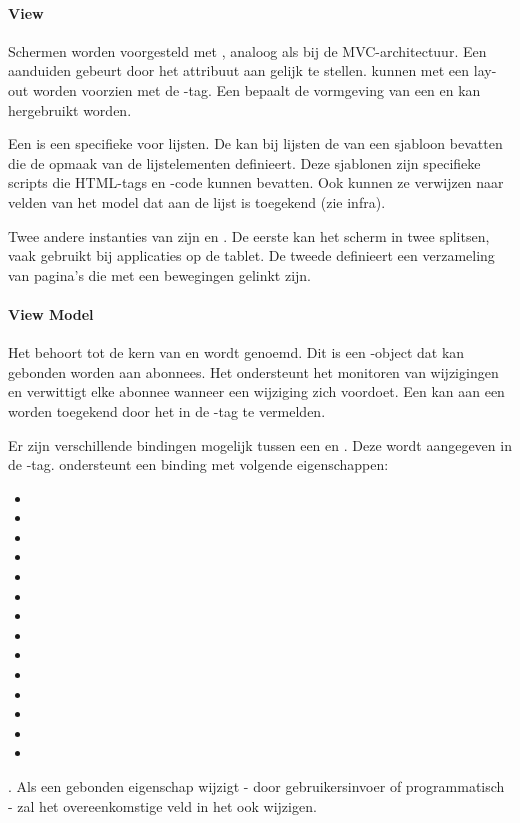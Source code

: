 \paragraph{View}
Schermen worden voorgesteld met ,  analoog als bij de MVC-architectuur.
Een  aanduiden gebeurt door het attribuut  aan  gelijk te stellen.
 kunnen met een lay-out worden voorzien met de -tag.
Een  bepaalt de vormgeving van een  en kan hergebruikt worden.

Een  is een specifieke  voor lijsten.
De  kan bij lijsten de  van een sjabloon bevatten die de opmaak van de lijstelementen definieert.
Deze sjablonen zijn specifieke \kendo{} scripts die HTML-tags en \js{}-code kunnen bevatten.
Ook kunnen ze verwijzen naar velden van het model dat aan de lijst is toegekend (zie infra).

Twee andere instanties van  zijn  en .
De eerste kan het scherm in twee  splitsen,  vaak gebruikt bij applicaties op de tablet.
De tweede definieert een verzameling van pagina's die met een  bewegingen gelinkt zijn.

\paragraph{View Model}
Het  behoort tot de kern van \kendo{} en wordt  genoemd.
Dit is een \js{}-object dat kan gebonden worden aan abonnees.
Het ondersteunt het monitoren van wijzigingen en verwittigt elke abonnee wanneer een wijziging zich voordoet.
Een  kan aan een  worden toegekend door het in de -tag te vermelden.

Er zijn verschillende bindingen	 mogelijk tussen een  en .
Deze wordt aangegeven in de -tag.
\kendo{} ondersteunt een binding met volgende eigenschappen:  
\begin{itemize}
  \item {}
  \item {}
  \item {}
  \item {}
  \item {}
  \item {}
  \item {}
  \item {}
  \item {}
  \item {}
  \item {}
  \item {}
  \item {}
  \item {}
\end{itemize}.
Als een gebonden eigenschap wijzigt - door gebruikersinvoer of programmatisch - zal het overeenkomstige veld in het  ook wijzigen.

